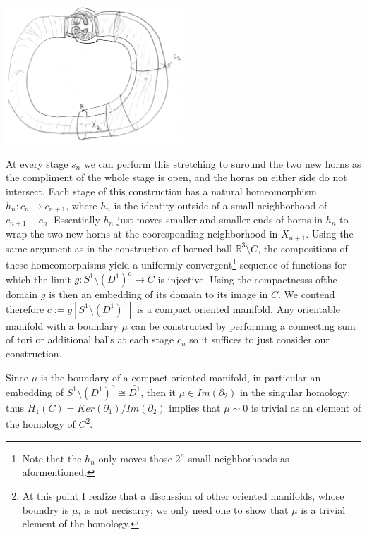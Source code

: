 \documentclass[11pt]{amsart}
\theoremstyle{definition}
\numberwithin{theorem}{section}
\numberwithin{definition}{section}
\numberwithin{equation}{section}
\begin{document}
    \begin{center}
  	\includegraphics[width=0.5\textwidth]{s1.png}
  \end{center}
  At every stage $s_n$ we can perform this stretching to suround the two new horns as the compliment of the whole stage is open, and the horns on either side do not intersect. Each stage of this construction has a natural homeomorphism $h_n: c_n \to c_{n+1}$, where $h_n$ is the identity outside of a small neighborhood of $c_{n+1} - c_{n}$. Essentially $h_n$ just moves smaller and smaller ends of horns in $h_n$ to wrap the two new horns at the cooresponding neighborhood in $X_{n+1}$. Using the same argument as in the construction of horned ball $ \mathbb{R}^3 \setminus C $, the compositions of these homeomorphisms yield a uniformly convergent\footnote{Note that the $h_n$ only moves those $2^n$ small neighborhoods as aformentioned.} sequence of functions for which the limit $g: S^1 \setminus (D^1)^o \to C$ is injective. Using the compactnesss ofthe domain $g$ is then an embedding of its domain to its image in $C.$ We contend therefore $c:= g[S^1 \setminus (D^1)^o]$ is a compact oriented manifold.  Any orientable manifold with a boundary $\mu$ can be constructed by performing a connecting sum of tori or additional balls at each stage $c_n$ so it suffices to just consider our construction. 

  Since $\mu$ is the boundary of a compact oriented manifold, in particular an embedding of $S^1 \setminus (D^1)^o \cong \bar{D^1}$, then it $\mu \in Im(\partial_2)$ in the singular homology; thus $H_1(C) = Ker(\partial_1)/Im(\partial_2)$ implies that $\mu \sim 0$ is trivial as an element of the homology of $C$\footnote{At this point I realize that a discussion of other oriented manifolds, whose boundry is $\mu$, is not necisarry; we only need one to show that $\mu$ is a trivial element of the homology. }.


 
\end{document}

